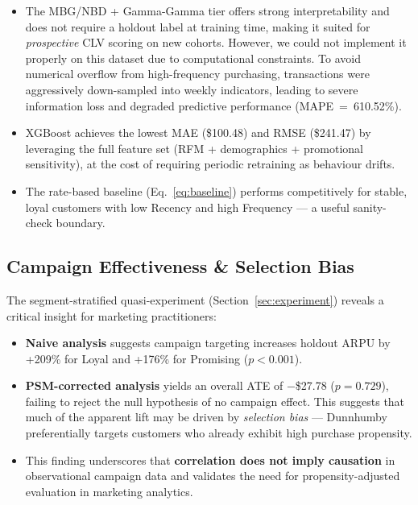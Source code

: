 \documentclass[conference]{IEEEtran}
\begin{document}
\begin{itemize}
  \item The MBG/NBD + Gamma-Gamma tier offers strong
        interpretability and does not require a holdout label
        at training time, making it suited for \emph{prospective}
        CLV scoring on new cohorts. However, we could not implement it properly on this dataset due to computational constraints. To avoid numerical overflow from high-frequency purchasing, transactions were aggressively down-sampled into weekly indicators, leading to severe information loss and degraded predictive performance (MAPE~=~610.52\%).
  \item XGBoost achieves the lowest MAE (\$100.48) and RMSE
        (\$241.47) by leveraging the full feature set (RFM +
        demographics + promotional sensitivity), at the cost
        of requiring periodic retraining as behaviour drifts.
  \item The rate-based baseline (Eq.~\ref{eq:baseline}) performs
        competitively for stable, loyal customers with low
        Recency and high Frequency --- a useful sanity-check
        boundary.
\end{itemize}

\subsection{Campaign Effectiveness \& Selection Bias}

The segment-stratified quasi-experiment
(Section~\ref{sec:experiment}) reveals a critical insight for
marketing practitioners:

\begin{itemize}
  \item \textbf{Naive analysis} suggests campaign targeting increases
        holdout ARPU by +209\% for Loyal and +176\% for Promising
        ($p < 0.001$).
  \item \textbf{PSM-corrected analysis} yields an overall ATE of
        $-$\$27.78 ($p = 0.729$), failing to reject the null hypothesis of no campaign effect. This suggests that much of the apparent lift may be driven by \emph{selection bias} --- Dunnhumby
        preferentially targets customers who already exhibit high
        purchase propensity.
  \item This finding underscores that \textbf{correlation does not
        imply causation} in observational campaign data and
        validates the need for propensity-adjusted evaluation in
        marketing analytics.
\end{itemize}
\end{document}
